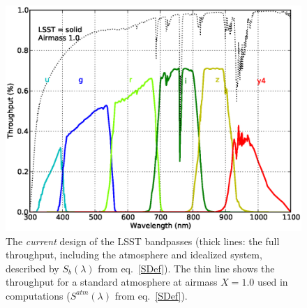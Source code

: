 \begin{figure}[h]\centering
\includegraphics[width=\textwidth]{filters_thruputs}
\caption{The \textit{current} design of the LSST bandpasses (thick lines:
the full throughput, including the atmosphere and idealized system,
described by $S_b(\lambda)$ from eq.~\ref{SDef}).
The thin line shows the throughput for a standard atmosphere at
airmass $X=1.0$ used in computations ($S^{atm}(\lambda)$ from eq.~\ref{SDef}).}
\end{figure}


\newpage
{}

\bigskip

